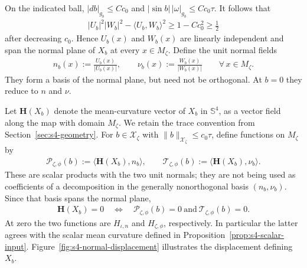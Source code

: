 \documentclass[a4paper,11pt,oneside,reqno]{amsart}
\numberwithin{equation}{section}
\theoremstyle{definition}
\begin{document}
%
On the indicated ball, $|db|_{g_b}\leq Cc_0$ and
$|\sin b|\,|\omega|_{g_b}\leq Cc_0\tau$.
It follows that
%
\begin{align*}
    |U_b|^2|W_b|^2-\langle U_b,W_b\rangle^2
    \geq 1-Cc_0^2\geq\frac12
\end{align*}
%
after decreasing $c_0$. Hence $U_b(x)$ and $W_b(x)$
are linearly independent and span the normal plane of $X_b$
at every $x\in M_\zeta$. Define the unit normal fields
%
\begin{align}
    \label{eq:s4-testing-normals}
    n_b(x):=\frac{U_b(x)}{|U_b(x)|},\qquad
    \nu_b(x):=\frac{W_b(x)}{|W_b(x)|}
    \qquad\forall\,x\in M_\zeta.
\end{align}
%
They form a basis of the normal plane, but need not be
orthogonal. At $b=0$ they reduce to $n$ and $\nu$.

Let $\mathbf H(X_b)$ denote the mean-curvature vector of
$X_b$ in $\mathbb S^4$, as a vector field along the map
with domain $M_\zeta$. We retain the trace convention from
Section~\ref{sec:s4-geometry}. For
$b\in\mathcal X_\zeta$ with
$\|b\|_{\mathcal X_\zeta}\leq c_0\tau$, define functions
on $M_\zeta$ by
%
\begin{align}
    \label{eq:s4-component-maps}
    \mathscr{P}_{\zeta,\phi}(b)
    :=\langle\mathbf{H}(X_b),n_b\rangle,
    \qquad
    \mathscr{T}_{\zeta,\phi}(b)
    :=\langle\mathbf{H}(X_b),\nu_b\rangle.
\end{align}
%
These are scalar products with the two unit normals; they
are not being used as coefficients of a decomposition in
the generally nonorthogonal basis $(n_b,\nu_b)$. Since
that basis spans the normal plane,
%
\begin{align*}
    \mathbf H(X_b)=0
    \quad\Leftrightarrow\quad
    \mathscr P_{\zeta,\phi}(b)=0
    \ \text{and}\ \mathscr T_{\zeta,\phi}(b)=0.
\end{align*}
%
At zero the two functions are $H_{\iota,n}$ and
$H_{\zeta,\phi}$, respectively. In particular the latter
agrees with the scalar mean curvature defined in
Proposition~\ref{prop:s4-scalar-input}.
Figure~\ref{fig:s4-normal-displacement} illustrates the
displacement defining $X_b$.
\end{document}
